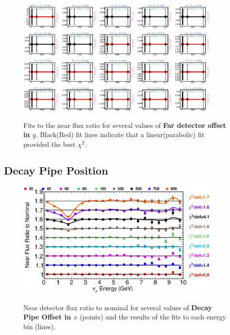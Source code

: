 \begin{figure}[hb]
  \begin{center}
    {\includegraphics[width=4.0in]{figures/LBNEFDY_near_fits.eps}}
  \end{center}
\caption{ Fits to the near flux ratio for several values of {\bf Far detector offset in $y$}. Black(Red) fit lines indicate that a linear(parabolic) fit provided the best $\chi^2$. }
\end{figure}

\clearpage
\subsection{Decay Pipe Position}

\begin{figure}[ht]
  \begin{center}
    {\includegraphics[width=4.0in]{figures/DecayPipeOffsetX_near_summary.eps}}
  \end{center}
\caption{ Near detector flux ratio to nominal for several values of {\bf Decay Pipe Offset in $x$} (points) and the results of the fits to each energy bin (lines).}
\end{figure}

